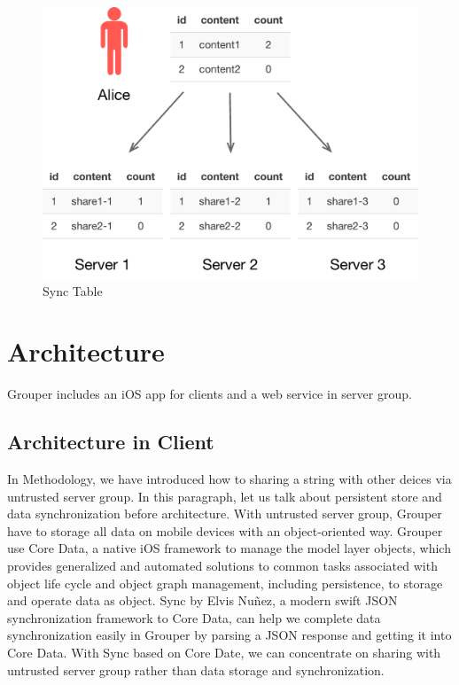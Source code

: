 \documentclass[twocolumn,10pt]{article}
\begin{document}
\begin{figure}[t]
\centering
\includegraphics[scale=0.4]{sync_table}
\caption{Sync Table}
\end{figure}

\section{Architecture}
Grouper includes an iOS app for clients and a web service in server group.

\subsection{Architecture in Client}
In Methodology, we have introduced how to sharing a string with other deices via untrusted server group. In this paragraph, let us talk about persistent store and data synchronization before architecture. With untrusted server group, Grouper have to storage all data on mobile devices with an object-oriented way. Grouper use Core Data\cite{coredata}, a native iOS framework to manage the model layer objects, which provides generalized and automated solutions to common tasks associated with object life cycle and object graph management, including persistence, to storage and operate data as object. Sync\cite{sync} by Elvis Nuñez, a modern swift JSON synchronization framework to Core Data, can help we complete data synchronization easily in Grouper by parsing a JSON response and getting it into Core Data. With Sync based on Core Date, we can concentrate on sharing with untrusted server group rather than data storage and synchronization.
\end{document}
